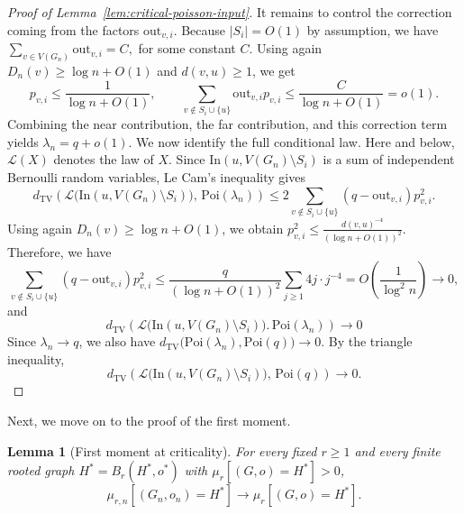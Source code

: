 \documentclass[10pt]{amsart}
\newtheorem{lemma}[theorem]{Lemma}
\begin{document}
\begin{proof}[Proof of Lemma~\ref{lem:critical-poisson-input}]
It remains to control the correction coming from the factors
\(\mathrm{out}_{v,i}\). Because $|S_i| = O(1)$ by assumption, we have
\(
\sum_{v\in V(G_n)} \mathrm{out}_{v,i} = C,
\)
for some constant $C$.
Using again \(D_n(v)\ge \log n+O(1)\) and \(d(v,u)\ge 1\), we get
\[
p_{v,i}\le \frac{1}{\log n+O(1)},
\qquad
\sum_{v\notin S_i\cup\{u\}} \mathrm{out}_{v,i}p_{v,i}
\le \frac{C}{\log n+O(1)}
=o(1).
\]
Combining the near contribution, the far contribution, and this correction term
yields
\(
\lambda_n=q+o(1).
\)
We now identify the full conditional law. Here and below,
\(\mathcal L(X)\) denotes the law of \(X\). Since
\(\mathrm{In}(u,V(G_n)\setminus S_i)\) is a sum of independent Bernoulli random
variables, Le Cam's inequality gives
\[
d_{\mathrm{TV}}\!\left(
\mathcal L\bigl(\mathrm{In}(u,V(G_n)\setminus S_i)\bigr),
\,\mathrm{Poi}(\lambda_n)\right)
\le
2\sum_{v\notin S_i\cup\{u\}} (q-\mathrm{out}_{v,i})p_{v,i}^2.
\]
Using again \(D_n(v)\ge \log n+O(1)\), we obtain
\(
p_{v,i}^2\le \frac{d(v,u)^{-4}}{(\log n+O(1))^2}.
\)
Therefore, we have
\[
\sum_{v\notin S_i\cup\{u\}} (q-\mathrm{out}_{v,i})p_{v,i}^2
\le
\frac{q}{(\log n+O(1))^2}\sum_{j\ge 1}4j\cdot j^{-4}
=O\!\left(\frac{1}{\log^2 n}\right)\to 0,
\]
and
\[
d_{\mathrm{TV}}\!\left(
\mathcal L\bigl(\mathrm{In}(u,V(G_n)\setminus S_i)\bigr).
\,\mathrm{Poi}(\lambda_n)\right)\to 0
\]
Since \(\lambda_n\to q\), we
also have
\(
d_{\mathrm{TV}}\bigl(\mathrm{Poi}(\lambda_n),\mathrm{Poi}(q)\bigr)\to 0.
\)
By the triangle inequality,
\[
d_{\mathrm{TV}}\!\left(
\mathcal L\bigl(\mathrm{In}(u,V(G_n)\setminus S_i) \bigr),
\,\mathrm{Poi}(q)\right)\to 0.
\]
\end{proof}

Next, we move on to the proof of the first moment.

\begin{lemma}[First moment at criticality]
For every fixed \(r\ge 1\) and every finite rooted graph \(H^*=B_r(H^*,o^*)\) with
\(\mu_r\left[(G,o)=H^*\right]>0\),
\[
\mu_{r,n}\left[(G_n,o_n)=H^*\right]\to \mu_r\left[(G,o)=H^*\right].
\]
\end{lemma}
\end{document}
